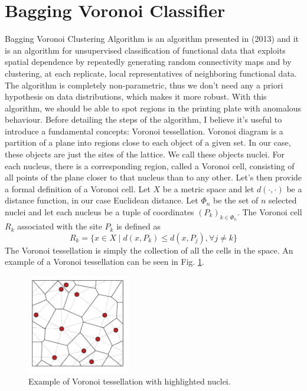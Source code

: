 \section{Bagging Voronoi Classifier}
\label{sec:bvc}
Bagging Voronoi Clustering Algorithm is an algorithm presented in \citeauthor{secchi_bagging_2013} (2013) and it is an algorithm for unsupervised classification of functional data that exploits spatial dependence by repeatedly generating random connectivity maps and by clustering, at each replicate, local representatives of neighboring functional data. The algorithm is completely non-parametric, thus we don't need any a priori hypothesis on data distributions, which makes it more robust. With this algorithm, we should be able to spot regions in the printing plate with anomalous behaviour. Before detailing the steps of the algorithm, I believe it's useful to introduce a fundamental concepts: Voronoi tessellation. Voronoi diagram is a partition of a plane into regions close to each object of a given set. In our case, these objects are just the sites of the lattice. We call these objects nuclei. For each nucleus, there is a corresponding region, called a Voronoi cell, consisting of all points of the plane closer to that nucleus than to any other. Let's then provide a formal definition of a Voronoi cell. Let $X$ be a metric space and let $d(\cdot, \cdot)$ be a distance function, in our case Euclidean distance. Let $\Phi_n$ be the set of $n$ selected nuclei and let each nucleus be a tuple of coordinates $\left(P_k\right)_{k\in \Phi_n}$. The Voronoi cell $R_k$ associated with the site $P_k$ is defined as
\begin{equation}
    \label{eq:voronoicell}
    R_k=\{x\in X \mid d(x, P_k)\leq d(x, P_j),\forall j\neq k\}
\end{equation}
The Voronoi tessellation is simply the collection of all the cells in the space.
An example of a Voronoi tessellation can be seen in Fig. \ref{fig:voronoi}.
\begin{figure}[H]
    \centering
    \includegraphics[width=0.4\textwidth]{Images/A-set-of-atoms-the-associated-Voronoi-tessellation-solid-lines-and-the-Delaunay.png}
    \caption[Voronoi tessellation.]{Example of Voronoi tessellation with highlighted nuclei.}
    \label{fig:voronoi}
\end{figure}


